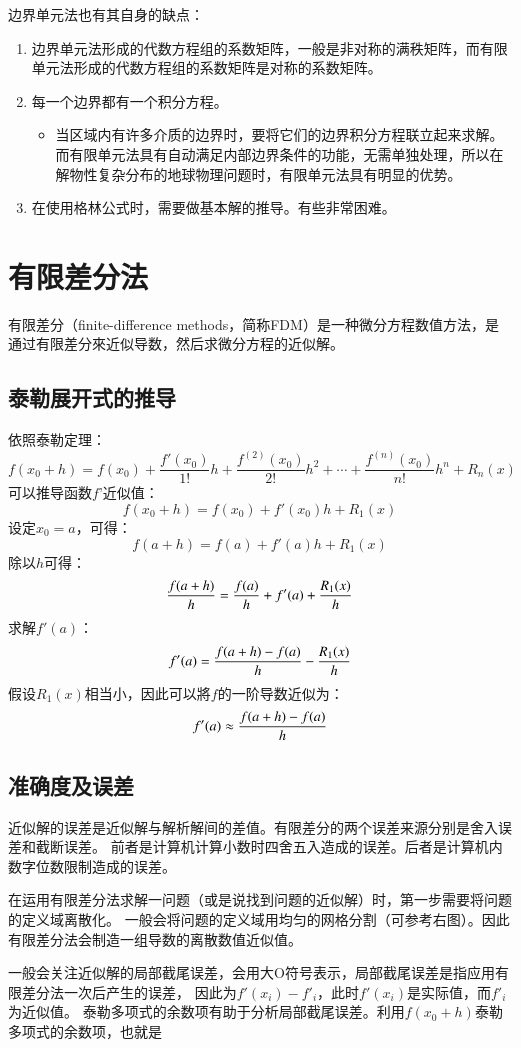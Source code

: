 \documentclass[hyperref,UTF-8]{ctexart}
\begin{document}
边界单元法也有其自身的缺点：

\begin{enumerate}
\item 边界单元法形成的代数方程组的系数矩阵，一般是非对称的满秩矩阵，而有限单元法形成的代数方程组的系数矩阵是对称的系数矩阵。
\item 每一个边界都有一个积分方程。
\begin{itemize}
\item 当区域内有许多介质的边界时，要将它们的边界积分方程联立起来求解。
而有限单元法具有自动满足内部边界条件的功能，无需单独处理，所以在解物性复杂分布的地球物理问题时，有限单元法具有明显的优势。
\end{itemize}
\item 在使用格林公式时，需要做基本解的推导。有些非常困难。
\end{enumerate}
\section{有限差分法}
有限差分（finite-difference methods，简称FDM）是一种微分方程数值方法，是通过有限差分來近似导数，然后求微分方程的近似解。
\subsection{泰勒展开式的推导}
依照泰勒定理：
$$f(x_0 + h) = f(x_0) + \frac{f'(x_0)}{1!}h + \frac{f^{(2)}(x_0)}{2!}h^2 + \cdots + \frac{f^{(n)}(x_0)}{n!}h^n + R_n(x)$$
可以推导函数$f’$近似值：
$$f(x_0 + h) = f(x_0) + f'(x_0)h + R_1(x)$$
设定$x_0=a$，可得：
$$f(a+h) = f(a) + f'(a)h + R_1(x)$$
除以$h$可得：
$${f(a+h)\over h} = {f(a)\over h} + f'(a)+{R_1(x)\over h}$$
求解$f'(a)$：
$$f'(a) = {f(a+h)-f(a)\over h} - {R_1(x)\over h}$$
假设$R_1(x)$相当小，因此可以將$f$的一阶导数近似为：
$$f'(a)\approx {f(a+h)-f(a)\over h}$$
\subsection{准确度及误差}
近似解的误差是近似解与解析解间的差值。有限差分的两个误差来源分别是舍入误差和截断误差。
前者是计算机计算小数时四舍五入造成的误差。后者是计算机内数字位数限制造成的误差。

在运用有限差分法求解一问题（或是说找到问题的近似解）时，第一步需要将问题的定义域离散化。
一般会将问题的定义域用均匀的网格分割（可参考右图）。因此有限差分法会制造一组导数的离散数值近似值。

一般会关注近似解的局部截尾误差，会用大O符号表示，局部截尾误差是指应用有限差分法一次后产生的误差，
因此为$f'(x_i) - f'_i$，此时$f'(x_i)$是实际值，而$f'_i$为近似值。
泰勒多项式的余数项有助于分析局部截尾误差。利用$f(x_0 + h)$泰勒多项式的余数项，也就是
\end{document}
